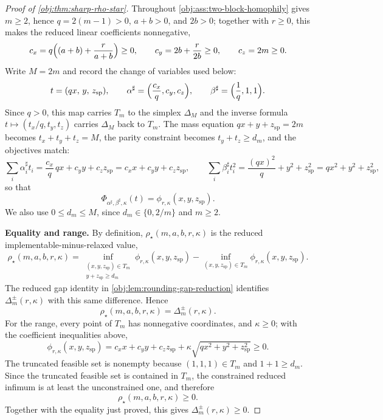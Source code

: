 \documentclass[11pt]{article}
\begin{document}
\begin{proof}[Proof of \cref{obj:thm:sharp-rho-star}]
Throughout \cref{obj:ass:two-block-homophily} gives \(m\ge2\), hence \(q=2(m-1)>0\), \(a+b>0\), and \(2b>0\); together with \(r\ge0\), this makes the reduced linear coefficients nonnegative,
\[
c_x=q\Bigl((a+b)+\frac{r}{a+b}\Bigr)\ge0,
\qquad
c_y=2b+\frac{r}{2b}\ge0,
\qquad
c_z=2m\ge0 .
\]
Write \(M=2m\) and record the change of variables used below:
\[
t=(qx,\,y,\,z_{\mathrm{sp}}),
\qquad
\alpha^\sharp=\Bigl(\frac{c_x}{q},c_y,c_z\Bigr),
\qquad
\beta^\sharp=\Bigl(\frac1q,1,1\Bigr).
\]
Since \(q>0\), this map carries \(T_m\) to the simplex \(\Delta_M\) and the inverse formula \(t\mapsto(t_x/q,t_y,t_z)\) carries \(\Delta_M\) back to \(T_m\).  The mass equation \(qx+y+z_{\mathrm{sp}}=2m\) becomes \(t_x+t_y+t_z=M\), the parity constraint becomes \(t_y+t_z\ge d_m\), and the objectives match:
\[
\sum_i\alpha^\sharp_i t_i=\frac{c_x}{q}\,qx+c_yy+c_zz_{\mathrm{sp}}
=c_xx+c_yy+c_zz_{\mathrm{sp}},
\qquad
\sum_i\beta^\sharp_i t_i^2=\frac{(qx)^2}{q}+y^2+z_{\mathrm{sp}}^2
=qx^2+y^2+z_{\mathrm{sp}}^2,
\]
so that
\[
\Phi_{\alpha^\sharp,\beta^\sharp,\kappa}(t)=\phi_{r,\kappa}(x,y,z_{\mathrm{sp}}).
\]
We also use \(0\le d_m\le M\), since \(d_m\in\{0,2/m\}\) and \(m\ge2\).

\textbf{Equality and range.}
By definition, \(\rho_\star(m,a,b,r,\kappa)\) is the reduced implementable-minus-relaxed value,
\[
\rho_\star(m,a,b,r,\kappa)
=
\inf_{\substack{(x,y,z_{\mathrm{sp}})\in T_m\\ y+z_{\mathrm{sp}}\ge d_m}}\phi_{r,\kappa}(x,y,z_{\mathrm{sp}})
-
\inf_{(x,y,z_{\mathrm{sp}})\in T_m}\phi_{r,\kappa}(x,y,z_{\mathrm{sp}}).
\]
The reduced gap identity in \cref{obj:lem:rounding-gap-reduction} identifies \(\Delta_m^{\pm}(r,\kappa)\) with this same difference.  Hence
\[
\rho_\star(m,a,b,r,\kappa)=\Delta_m^{\pm}(r,\kappa).
\]
For the range, every point of \(T_m\) has nonnegative coordinates, and \(\kappa\ge0\); with the coefficient inequalities above,
\[
\phi_{r,\kappa}(x,y,z_{\mathrm{sp}})
=c_xx+c_yy+c_zz_{\mathrm{sp}}+\kappa\sqrt{qx^2+y^2+z_{\mathrm{sp}}^2}\ge0 .
\]
The truncated feasible set is nonempty because \((1,1,1)\in T_m\) and \(1+1\ge d_m\).  Since the truncated feasible set is contained in \(T_m\), the constrained reduced infimum is at least the unconstrained one, and therefore
\[
\rho_\star(m,a,b,r,\kappa)\ge0 .
\]
Together with the equality just proved, this gives \(\Delta_m^{\pm}(r,\kappa)\ge0\). %


\end{proof}
\end{document}
